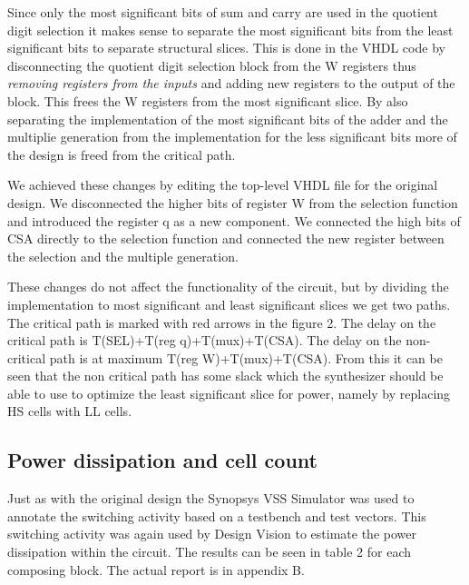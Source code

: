 \documentclass[11pt,a4paper]{article}
\begin{document}
\FloatBarrier

Since only the most significant bits of sum and carry are used in the quotient digit selection it makes sense to separate the most significant bits from the least significant bits to separate structural slices. This is done in the VHDL code by disconnecting the quotient digit selection block from the W registers thus \textit{removing registers from the inputs} and adding new registers to the output of the block. This frees the W registers from the most significant slice. By also separating the implementation of the most significant bits of the adder and the multiplie generation from the implementation for the less significant bits more of the design is freed from the critical path.

We achieved these changes by editing the top-level VHDL file for the original design. We disconnected the higher bits of register W from the selection function and introduced the register q as a new component. We connected the high bits of CSA directly to the selection function and connected the new register between the selection and the multiple generation.

These changes do not affect the functionality of the circuit, but by dividing the implementation to most significant and least significant slices we get two paths. The critical path is marked with red arrows in the figure 2. The delay on the critical path is T(SEL)+T(reg q)+T(mux)+T(CSA). The delay on the non-critical path is at maximum T(reg W)+T(mux)+T(CSA). From this it can be seen that the non critical path has some slack which the synthesizer should be able to use to optimize the least significant slice for power, namely by replacing HS cells with LL cells.


\subsection{Power dissipation and cell count}
Just as with the original design the Synopsys VSS Simulator was used to annotate the switching activity based on a testbench and test vectors. This switching activity was again used by Design Vision to estimate the power dissipation within the circuit. The results can be seen in table 2 for each composing block. The actual report is in appendix B.
\end{document}
